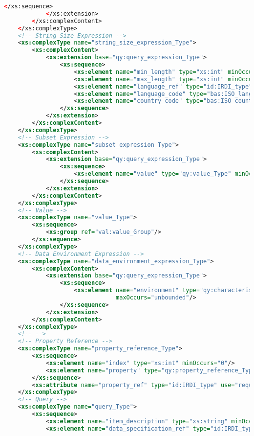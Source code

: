 \begin{lstlisting}[caption=query.xsd, language=XML, label=lst:query_xsd]
                </xs:sequence>
            </xs:extension>
        </xs:complexContent>
    </xs:complexType>
    <!-- String Size Expression -->
    <xs:complexType name="string_size_expression_Type">
        <xs:complexContent>
            <xs:extension base="qy:query_expression_Type">
                <xs:sequence>
                    <xs:element name="min_length" type="xs:int" minOccurs="0"/>
                    <xs:element name="max_length" type="xs:int" minOccurs="0"/>
                    <xs:element name="language_ref" type="id:IRDI_type" minOccurs="0"/>
                    <xs:element name="language_code" type="bas:ISO_language_code_Type" minOccurs="0"/>
                    <xs:element name="country_code" type="bas:ISO_country_code_Type" minOccurs="0"/>
                </xs:sequence>
            </xs:extension>
        </xs:complexContent>
    </xs:complexType>
    <!-- Subset Expression -->
    <xs:complexType name="subset_expression_Type">
        <xs:complexContent>
            <xs:extension base="qy:query_expression_Type">
                <xs:sequence>
                    <xs:element name="value" type="qy:value_Type" minOccurs="0" maxOccurs="unbounded"/>
                </xs:sequence>
            </xs:extension>
        </xs:complexContent>
    </xs:complexType>
    <!-- Value -->
    <xs:complexType name="value_Type">
        <xs:sequence>
            <xs:group ref="val:value_Group"/>
        </xs:sequence>
    </xs:complexType>
    <!-- Data Environment Expression -->
    <xs:complexType name="data_environment_expression_Type">
        <xs:complexContent>
            <xs:extension base="qy:query_expression_Type">
                <xs:sequence>
                    <xs:element name="environment" type="qy:characteristic_data_query_expression_Type"
                                maxOccurs="unbounded"/>
                </xs:sequence>
            </xs:extension>
        </xs:complexContent>
    </xs:complexType>
    <!-- -->
    <!-- Property Reference -->
    <xs:complexType name="property_reference_Type">
        <xs:sequence>
            <xs:element name="index" type="xs:int" minOccurs="0"/>
            <xs:element name="property" type="qy:property_reference_Type" minOccurs="0"/>
        </xs:sequence>
        <xs:attribute name="property_ref" type="id:IRDI_type" use="required"/>
    </xs:complexType>
    <!-- Query -->
    <xs:complexType name="query_Type">
        <xs:sequence>
            <xs:element name="item_description" type="xs:string" minOccurs="0"/>
            <xs:element name="data_specification_ref" type="id:IRDI_type" minOccurs="0"/>

\end{lstlisting}
